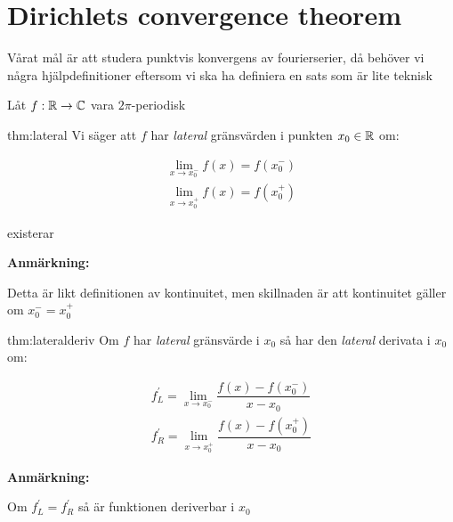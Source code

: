 \section{Dirichlets convergence theorem}\par
\noindent Vårat mål är att studera punktvis konvergens av fourierserier, då behöver vi några hjälpdefinitioner eftersom vi ska ha definiera en sats som är lite teknisk 
\par\bigskip
\noindent Låt $f:\mathbb{R}\to\mathbb{C}$ vara $2\pi$-periodisk
\par\bigskip
\begin{theo}{thm:lateral}
  Vi säger att $f$ har \textit{lateral} gränsvärden i punkten $x_0\in\mathbb{R}$ om:\par
  \begin{equation*}
    \begin{gathered}
      \lim_{x\to x_0^-}f(x) = f(x_0^-)\\
      \lim_{x\to x_0^+}f(x) = f(x_0^+)
    \end{gathered}
  \end{equation*}\par
  \noindent existerar
\end{theo}
\par\bigskip
\noindent\textbf{Anmärkning:}\par
\noindent Detta är likt definitionen av kontinuitet, men skillnaden är att kontinuitet gäller om $x_0^- = x_0^+$
\par\bigskip
\begin{theo}{thm:lateralderiv}
  Om $f$ har \textit{lateral} gränsvärde i $x_0$ så har den \textit{lateral} derivata i $x_0$ om:\par
  \begin{equation*}
    \begin{gathered}
      f_L^{\prime} = \lim_{x\to x_0^-}\dfrac{f(x)-f(x_0^-)}{x-x_0}\\
      f_R^{\prime} = \lim_{x\to x_0^+}\dfrac{f(x)-f(x_0^+)}{x-x_0}
    \end{gathered}
  \end{equation*}
\end{theo}
\par\bigskip
\noindent\textbf{Anmärkning:}\par
\noindent Om $f_L^{\prime} = f_R^{\prime}$ så är funktionen deriverbar i $x_0$
\par\bigskip
